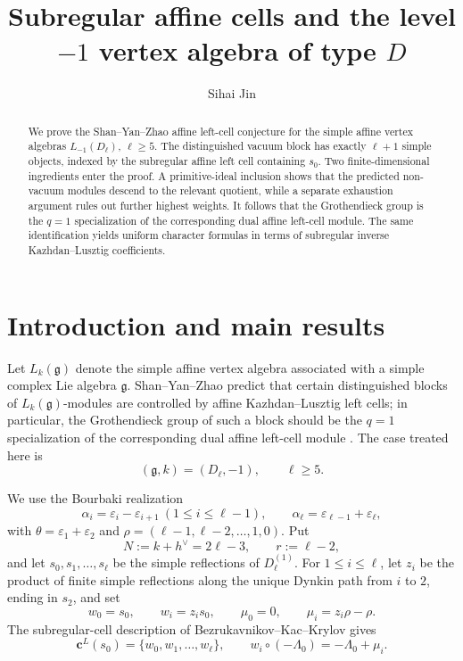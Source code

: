 \documentclass[11pt]{amsart}
\title[Subregular affine cells for $L_{-1}(D_\ell)$]{Subregular affine cells and the level $-1$ vertex algebra of type $D$}
\author{Sihai Jin}
\date{}
\theoremstyle{remark}
\numberwithin{equation}{section}
\begin{document}
\begin{abstract}
We prove the Shan--Yan--Zhao affine left-cell conjecture for the simple affine vertex algebras $L_{-1}(D_\ell)$, $\ell\ge5$.  The distinguished vacuum block has exactly $\ell+1$ simple objects, indexed by the subregular affine left cell containing $s_0$.  Two finite-dimensional ingredients enter the proof.  A primitive-ideal inclusion shows that the predicted non-vacuum modules descend to the relevant quotient, while a separate exhaustion argument rules out further highest weights.  It follows that the Grothendieck group is the $q=1$ specialization of the corresponding dual affine left-cell module.  The same identification yields uniform character formulas in terms of subregular inverse Kazhdan--Lusztig coefficients.
\end{abstract}

\maketitle

\section{Introduction and main results}

Let \(L_k(\mathfrak g)\) denote the simple affine vertex algebra associated
with a simple complex Lie algebra \(\mathfrak g\).  Shan--Yan--Zhao predict
that certain distinguished blocks of \(L_k(\mathfrak g)\)-modules are
controlled by affine Kazhdan--Lusztig left cells; in particular, the
Grothendieck group of such a block should be the \(q=1\) specialization of
the corresponding dual affine left-cell module \cite{ShanYanZhao2026}.  The
case treated here is
\[
   (\mathfrak g,k)=(D_\ell,-1),\qquad \ell\ge5.
\]

We use the Bourbaki realization
\[
 \alpha_i=\varepsilon_i-\varepsilon_{i+1}\ (1\le i\le\ell-1),
 \qquad \alpha_\ell=\varepsilon_{\ell-1}+\varepsilon_\ell,
\]
with \(\theta=\varepsilon_1+\varepsilon_2\) and
\(\rho=(\ell-1,\ell-2,\ldots,1,0)\).  Put
\[
   N:=k+h^\vee=2\ell-3,\qquad r:=\ell-2,
\]
and let \(s_0,s_1,\ldots,s_\ell\) be the simple reflections of
\(D_\ell^{(1)}\).  For \(1\le i\le\ell\), let \(z_i\) be the product of
finite simple reflections along the unique Dynkin path from \(i\) to \(2\),
ending in \(s_2\), and set
\[
   w_0=s_0,\qquad w_i=z_i s_0,\qquad
   \mu_0=0,\qquad \mu_i=z_i\rho-\rho.
\]
The subregular-cell description of
Bezrukavnikov--Kac--Krylov \cite{BezrukavnikovKacKrylov2024} gives
\[
   \mathbf c^L(s_0)=\{w_0,w_1,\ldots,w_\ell\},
   \qquad
   w_i\circ(-\Lambda_0)=-\Lambda_0+\mu_i.
\]
\end{document}

